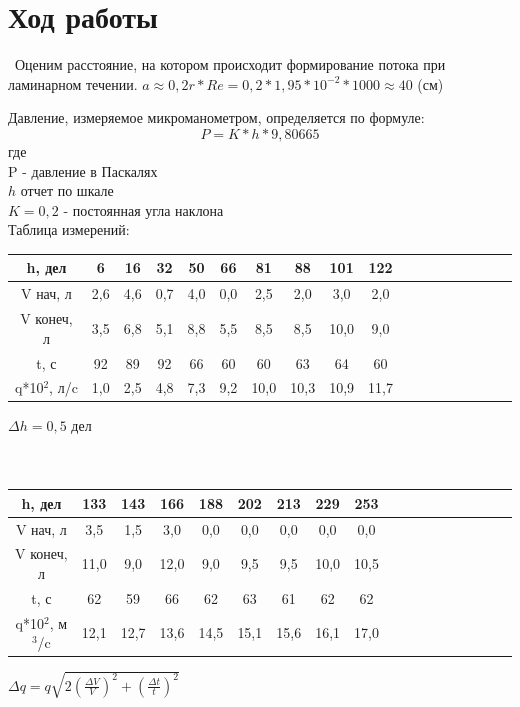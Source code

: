 \documentclass[11pt]{article}
\begin{document}
\section*{Ход работы}\
\indent Оценим расстояние, на котором происходит формирование потока при ламинарном течении.
$a\approx0,2r*Re=0,2*1,95*10^{-2}*1000\approx 40$ (см)

Давление, измеряемое микроманометром, определяется по формуле:
$$P=K*h*9,80665$$
где \\
P - давление в Паскалях \\
$h$ отчет по шкале\\
$K=0,2$ - постоянная угла наклона\\
Таблица измерений:\\
\begin{tabular}{|c|c|c|c|c|c|c|c|c|c|c|c|c|c|c|c|c|c|}
\hline 
h, дел & 6 & 16 & 32 & 50 & 66 & 81 & 88 & 101 & 122  \\ 
\hline 
V нач, л & 2,6 & 4,6 & 0,7 & 4,0 & 0,0 & 2,5 & 2,0 & 3,0 & 2,0  \\ 
\hline 
V конеч, л & 3,5 & 6,8 & 5,1 & 8,8 & 5,5 & 8,5 & 8,5 & 10,0 & 9,0  \\ 
\hline 
t, с & 92 & 89 & 92 & 66 & 60 & 60 & 63 & 64 & 60  \\ 
\hline 
q*10$^2$, л/c & 1,0 & 2,5 & 4,8 & 7,3 & 9,2 & 10,0 & 10,3 & 10,9 & 11,7  \\ 
\hline 
\end{tabular} $\Delta h = 0,5$ дел
\ \\
\ \\
\ \\
\begin{tabular}{|c|c|c|c|c|c|c|c|c|c|c|c|c|c|c|c|c|c|}
\hline 
h, дел & 133 & 143 & 166 & 188 & 202 & 213 & 229 & 253 \\ 
\hline 
V нач, л  & 3,5 & 1,5 & 3,0 & 0,0 & 0,0 & 0,0 & 0,0 & 0,0 \\ 
\hline 
V конеч, л  & 11,0 & 9,0 & 12,0 & 9,0 & 9,5 & 9,5 & 10,0 & 10,5 \\ 
\hline 
t, с  & 62 & 59 & 66 & 62 & 63 & 61 & 62 & 62 \\ 
\hline 
q*10$^2$, м$^3$/c & 12,1 & 12,7 & 13,6 & 14,5 & 15,1 & 15,6 & 16,1 & 17,0 \\ 
\hline 
\end{tabular}  $\Delta q =q\sqrt{2(\frac{\Delta V}{V})^2+(\frac{\Delta t}{t})^2}$ 
\ \\
\ \\
\end{document}
